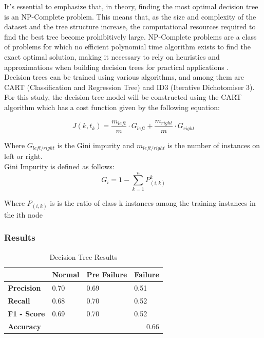 \documentclass{article}
\begin{document}
It's essential to emphasize that, in theory, finding the most optimal decision tree is an NP-Complete problem. This means that, as the size and complexity of the dataset and the tree structure increase, the computational resources required to find the best tree become prohibitively large. NP-Complete problems are a class of problems for which no efficient polynomial time algorithm exists to find the exact optimal solution, making it necessary to rely on heuristics and approximations when building decision trees for practical applications \cite{laurent1976}.\\

Decision trees can be trained using various algorithms, and among them are CART (Classification and Regression Tree) and ID3 (Iterative Dichotomiser 3). For this study, the decision tree model will be constructed using the CART algorithm which has a cost function given by the following equation:

\begin{equation}
    J(k, t_k) = \frac{m_{left}}{m} \cdot G_{left} + \frac{m_{right}}{m} \cdot G_{right}
\end{equation}

Where $G_{left/right}$ is the Gini impurity and $m_{left/right}$ is the number of instances on left or right.\\

Gini Impurity is defined as follows:
\begin{equation}
    G_i = 1 - \sum_{k = 1}^{n}{P_{(i,k)}^2}
\end{equation}

Where $P_{(i,k)}$ is  is the ratio of class k instances among the training instances in the ith node

\subsubsection{Results}

\begin{table}[htbp]
\centering
\caption{Decision Tree Results}
\begin{tabular}{|l|lll|}
\hline
                    & \multicolumn{1}{l|}{\textbf{Normal}} & \multicolumn{1}{l|}{\textbf{Pre Failure}} & \textbf{Failure} \\ \hline
\textbf{Precision}  & \multicolumn{1}{l|}{0.70}            & \multicolumn{1}{l|}{0.69}                 & 0.51             \\ \hline
\textbf{Recall}     & \multicolumn{1}{l|}{0.68}            & \multicolumn{1}{l|}{0.70}                 & 0.52             \\ \hline
\textbf{F1 - Score} & \multicolumn{1}{l|}{0.69}            & \multicolumn{1}{l|}{0.70}                 & 0.52             \\ \hline
\textbf{Accuracy}   & \multicolumn{3}{r|}{0.66}                                                                           \\ \hline
\end{tabular}
\end{table}
\end{document}
